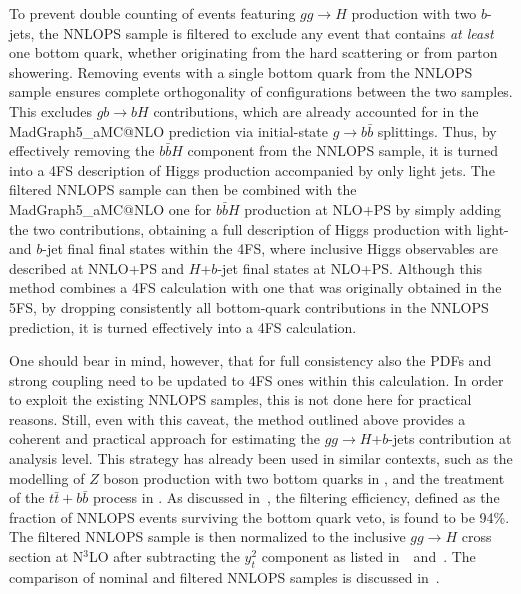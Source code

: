 \documentclass[11pt,a4paper]{article}
\begin{document}
To prevent double counting of events featuring $gg \to H$ production with two $b$-jets, the {\sc NNLOPS} sample is filtered to exclude any event that contains 
{\it at least} one bottom quark, whether originating from the hard scattering or from parton showering. 
Removing events with a single bottom quark from the {\sc NNLOPS} sample ensures complete orthogonality of configurations between the two samples. 
This excludes $g  b \to b H$ contributions, which are already accounted for in the {\sc MadGraph5\_aMC@NLO} prediction via initial-state $g \to b\bar{b}$ splittings. Thus, by effectively removing the $b\bar{b}H$ component from the {\sc NNLOPS} sample, it is turned 
into a 4FS description of Higgs production accompanied by 
only light jets. The filtered {\sc NNLOPS} sample can then be combined with the {\sc MadGraph5\_aMC@NLO} one for 
$b\bar{b}H$ production at NLO+PS by simply adding the two contributions, obtaining a full description of Higgs production with light- and $b$-jet
final final states within the 4FS, where inclusive Higgs observables are described at NNLO+PS and $H$+$b$-jet final states at NLO+PS. 
Although this method combines a 4FS calculation with one that was originally obtained in the 5FS, by dropping consistently all bottom-quark contributions
in the NNLOPS prediction, it is turned effectively into a 4FS calculation.

One should bear in mind, however, that for full consistency also the PDFs and strong
coupling need to be updated to 4FS ones within this calculation. In order to exploit the existing NNLOPS samples, this is not done here for practical reasons.
Still, even with this caveat, the method outlined above provides a coherent and practical approach for estimating the $gg \to H$+$b$-jets contribution at analysis level. 
This strategy has already been used in similar contexts, such as the modelling of $Z$ boson production with two bottom quarks in , and the treatment of the $t\bar{t}+b\bar{b}$ process in .  
As discussed in~\citere{}, the filtering efficiency, defined as the fraction of {\sc NNLOPS} events surviving the bottom quark veto, is found to be 94\%. The filtered {\sc NNLOPS} sample is then normalized to the inclusive $gg \to H$ cross section at N$^3$LO after subtracting the $y_t^2$ \bbH{} component as listed in~~and~. The comparison of nominal and filtered {\sc NNLOPS} samples is discussed in~.
\end{document}
